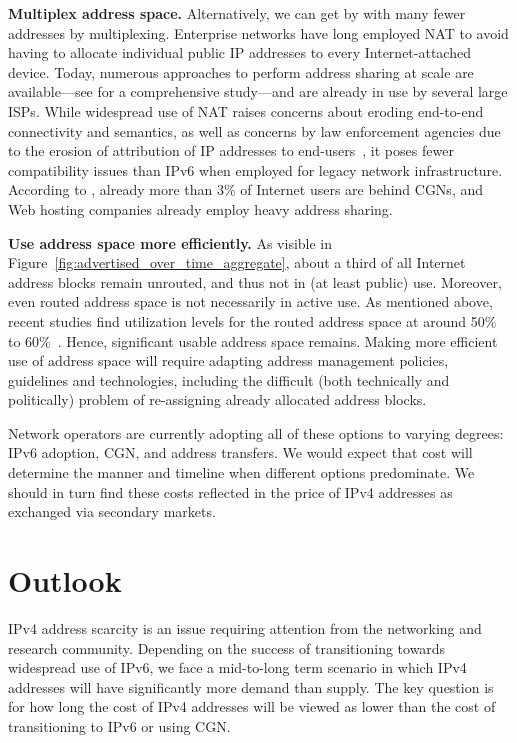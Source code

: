 \documentclass[letter]{sigcomm-alternate}
\begin{document}
\textbf{Multiplex address space.}
Alternatively, we can get by with many fewer addresses by multiplexing. 
Enterprise networks have long employed NAT to avoid having to allocate 
individual public IP addresses to every Internet-attached device.  Today, 
numerous approaches  to perform address sharing at scale are 
available---see \cite{address_sharing_ton} for a comprehensive
study---and are
already in use by several large ISPs.  While widespread use of NAT raises 
concerns about eroding end-to-end connectivity and semantics, as well as 
concerns by law enforcement agencies due to the erosion of attribution of IP 
addresses to end-users~\cite{cgn_fbi}, it poses fewer compatibility issues than 
IPv6 when employed for legacy network infrastructure.  According to 
\cite{cgn_deployment}, already more than 3\% of Internet users are behind CGNs, 
and Web hosting companies already employ heavy address sharing.

\textbf{Use address space more efficiently.}
As visible in Figure~\ref{fig:advertised_over_time_aggregate}, about a third of
all Internet address blocks remain unrouted, and thus not in (at least public)
use.  Moreover, even routed address space is not necessarily in active use. As
mentioned above, recent studies find utilization levels for the routed address
space at around 50\% to 
60\%~\cite{dainotti_2014,lostinspace_2014,capturingghosts}.  Hence, significant 
usable address space remains.  Making more efficient use of address space will 
require adapting address management policies, guidelines and technologies, 
including the
difficult (both technically and politically) problem of re-assigning already
allocated address blocks.
  

Network operators are currently adopting all of these options to varying
degrees: IPv6 adoption, CGN, and address transfers. We would
expect that cost will determine the manner and timeline when different
options predominate.  We should in turn find these costs reflected in the price
of IPv4 addresses as exchanged via secondary markets.

\section{Outlook}

IPv4 address scarcity is an issue requiring attention from the networking and
research community. Depending on the success of transitioning towards
widespread use of IPv6, we face a mid-to-long term scenario in which IPv4
addresses will have significantly more demand than supply. The key question is
for how long the cost of IPv4 addresses will be viewed as lower than the cost
of transitioning to IPv6 or using CGN.
\end{document}
